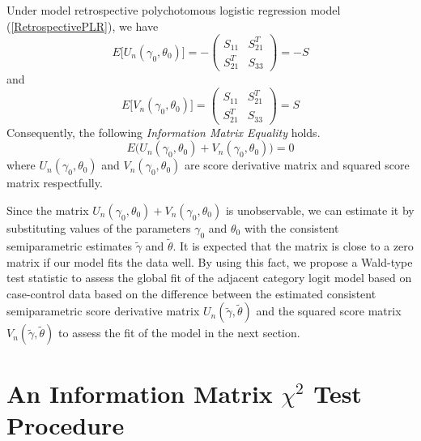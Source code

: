 \documentclass[12]{interact}
\theoremstyle{plain}%
\theoremstyle{definition}
\theoremstyle{remark}
\begin{document}
{\theorem Under model retrospective polychotomous logistic regression model (\ref{RetrospectivePLR}), we have
	\begin{equation}
		E\Big[U_n(\gamma_0,\theta_0) \Big]=- \left(\begin{array}{cc} S_{11}
			& S_{21}^T \\ S_{21}^T & S_{33}
		\end{array} \right)=- S
	\end{equation}
	and
	\begin{equation}
		E\Big[V_n(\gamma_0,\theta_0)\Big]= \left(\begin{array}{cc} S_{11} &
			S_{21}^T \\ S_{21}^T & S_{33}
		\end{array} \right)= S
		\label{squarescore}
	\end{equation}
	Consequently, the following {\em Information Matrix Equality} holds.
	\begin{equation}
		E\big(U_n(\gamma_0,\theta_0)+V_n(\gamma_0,\theta_0) \big)=0
	\end{equation}
	where $U_n(\gamma_0,\theta_0)$ and $V_n(\gamma_0,\theta_0)$ are
	score derivative matrix and squared score matrix respectfully. }

Since the matrix $U_n(\gamma_0,\theta_0)+V_n(\gamma_0,\theta_0)$ is
unobservable, we can estimate it by substituting values of the
parameters $\gamma_0$ and $\theta_0$ with the consistent
semiparametric estimates $\tilde{\gamma}$ and $\tilde{\theta}$. It
is expected that the matrix is close to a zero matrix if our model
fits the data well. By using this fact, we propose a Wald-type
test statistic to assess the global fit of the adjacent category
logit model based on case-control data based on the difference
between the estimated consistent semiparametric score derivative
matrix $U_n(\tilde{\gamma},\tilde{\theta})$ and the squared score
matrix $V_n(\tilde{\gamma},\tilde{\theta})$ to assess the fit of
the model in the next section.


\section{An Information Matrix $\chi^2$ Test Procedure} \label{sec4}
\end{document}
